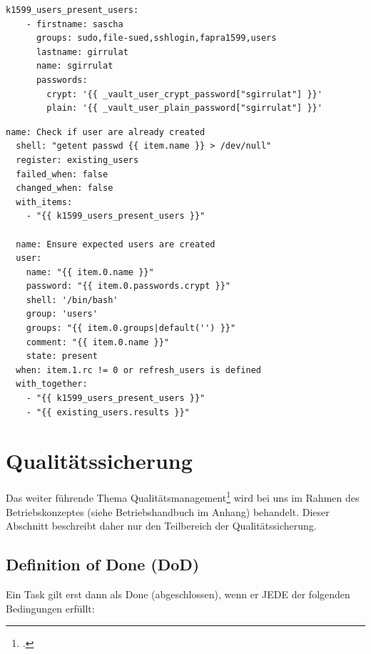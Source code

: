 \begin{lstlisting}[label=code:syslog3,caption=Auszug aus ansible/group\_vars/file\_server/public]
  k1599_users_present_users:
    - firstname: sascha
      groups: sudo,file-sued,sshlogin,fapra1599,users
      lastname: girrulat
      name: sgirrulat
      passwords:
        crypt: '{{ _vault_user_crypt_password["sgirrulat"] }}'
        plain: '{{ _vault_user_plain_password["sgirrulat"] }}'
\end{lstlisting}

\begin{lstlisting}[label=code:syslog3,caption=Auszug aus der Datei ansible/roles/k1599\_users/tasks/main.yml]
  name: Check if user are already created
  shell: "getent passwd {{ item.name }} > /dev/null"
  register: existing_users
  failed_when: false
  changed_when: false
  with_items:
    - "{{ k1599_users_present_users }}"

  name: Ensure expected users are created
  user:
    name: "{{ item.0.name }}"
    password: "{{ item.0.passwords.crypt }}"
    shell: '/bin/bash'
    group: 'users'
    groups: "{{ item.0.groups|default('') }}"
    comment: "{{ item.0.name }}"
    state: present
  when: item.1.rc != 0 or refresh_users is defined
  with_together:
    - "{{ k1599_users_present_users }}"
    - "{{ existing_users.results }}"
\end{lstlisting}


\section{Qualitätssicherung}
\label{sec:qs}
Das weiter führende Thema Qualitätsmanagement\footcite{wikiQualityM} wird bei uns im Rahmen des Betriebskonzeptes (siehe Betriebshandbuch im Anhang) behandelt. Dieser Abschnitt beschreibt daher nur den Teilbereich der Qualitätssicherung.

\subsection{Definition of Done (DoD)}
\label{subsec:dod}
Ein Task gilt erst dann als Done (abgeschlossen), wenn er JEDE der folgenden Bedingungen erfüllt:

